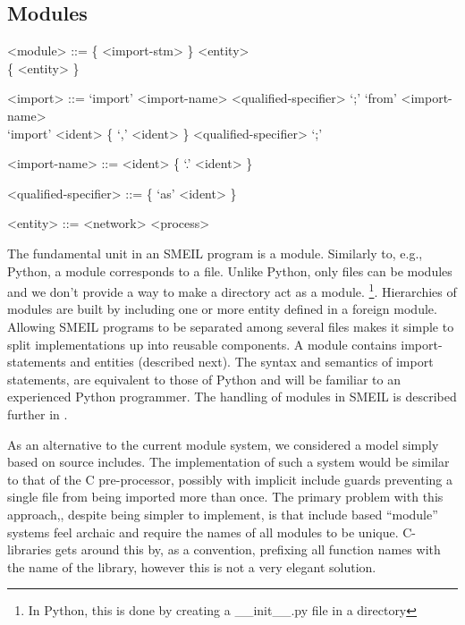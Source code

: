 \setlength{\grammarindent}{10em} %

\subsection{Modules}
\begin{grammar}
  <module> ::= \{ <import-stm> \} <entity> \\ \{ <entity> \}

  <import> ::= `import' <import-name> <qualified-specifier> `;'
  \alt `from' <import-name> \\ `import' <ident> \{ `,' <ident> \} <qualified-specifier>
  `;'

  <import-name> ::= <ident> \{ `.' <ident> \}

  <qualified-specifier> ::= \{ `as' <ident> \}

  <entity> ::= <network>
  \alt <process>
\end{grammar}


The fundamental unit in an SMEIL program is a {\ttfamily module}. Similarly to,
e.g., Python, a module corresponds to a file. Unlike Python, only files can be
modules and we don't provide a way to make a directory act as a
module. \footnote{In Python, this is done by creating a {\ttfamily
    \_\_init\_\_.py} file in a directory}. Hierarchies of modules are built by
including one or more entity defined in a foreign module. Allowing SMEIL
programs to be separated among several files makes it simple to split
implementations up into reusable components. A module contains import-statements
and entities (described next). The syntax and semantics of import statements,
are equivalent to those of Python and will be familiar to an experienced Python
programmer. The handling of modules in SMEIL is described further in .

As an alternative to the current module system, we considered a model simply
based on source includes. The implementation of such a system would be similar
to that of the C pre-processor, possibly with implicit include guards preventing
a single file from being imported more than once. The primary problem with this
approach,, despite being simpler to implement, is that include based ``module''
systems feel archaic and require the names of all modules to be
unique. C-libraries gets around this by, as a convention, prefixing all function
names with the name of the library, however this is not a very elegant solution.

